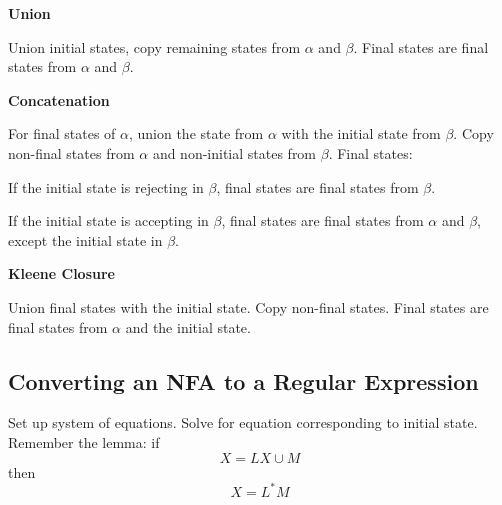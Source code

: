 \begin{center}\textbf{Union}\end{center} 

Union initial states, copy remaining states from \(\alpha \) and \(\beta \). Final states are final states from \(\alpha \) and \(\beta \). 

\begin{center}\textbf{Concatenation}\end{center}

For final states of \(\alpha \), union the state from \(\alpha \) with the initial state from \(\beta \). Copy non-final states from \(\alpha \) and non-initial states from \(\beta \). Final states:

If the initial state is rejecting in \(\beta \), final states are final states from \(\beta \). 

If the initial state is accepting in \(\beta \), final states are final states from \(\alpha \) and \(\beta \), except the initial state in \(\beta \). 

\begin{center}\textbf{Kleene Closure}\end{center}

Union final states with the initial state. Copy non-final states. Final states are final states from \(\alpha \) and the initial state.

\subsection{Converting an NFA to a Regular Expression}

Set up system of equations. Solve for equation corresponding to initial state. Remember the lemma: if \[X=LX\cup M\] then \[X=L^*M\]